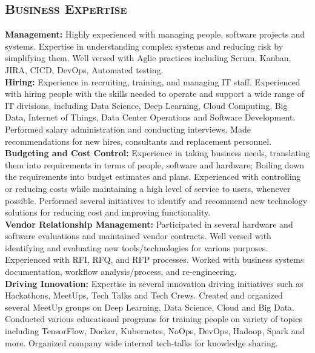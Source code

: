 \begin{resume}
\section{\textsc{Business Expertise}}
{\bf Management:} Highly experienced with managing people, software projects and systems. Expertise in understanding complex systems and reducing risk by simplifying them. Well versed with Aglie practices including Scrum, Kanban, JIRA, CICD, DevOps, Automated testing.\\
{\bf Hiring:} Experience in recruiting, training, and managing IT staff. Experienced with hiring people with the skills needed to operate and support a wide range of IT divisions, including Data Science, Deep Learning, Cloud Computing, Big Data, Internet of Things, Data Center Operations and Software Development. Performed salary administration and conducting interviews. Made recommendations for new hires, consultants and replacement personnel.\\
{\bf Budgeting and Cost Control:} Experience in taking business needs, translating them into requirements in terms of people, software and hardware; Boiling down the requirements into budget estimates and plans. Experienced with controlling or reducing costs while maintaining a high level of service to users, whenever possible. Performed several initiatives to identify and recommend new technology solutions for reducing cost and improving functionality.\\
{\bf Vendor Relationship Management:} Participated in several hardware and software evaluations and maintained vendor contracts. Well versed with identifying and evaluating new tools/technologies for various purposes. Experienced with RFI, RFQ, and RFP processes. Worked with business systems documentation, workflow analysis/process, and re-engineering.\\
{\bf Driving Innovation:} Expertise in several innovation driving initiatives such as Hackathons, MeetUps, Tech Talks and Tech Crews. Created and organized several MeetUp groups on Deep Learning, Data Science, Cloud and Big Data. Conducted various educational programs for training people on variety of topics including TensorFlow, Docker, Kubernetes, NoOps, DevOps, Hadoop, Spark and more. Organized company wide internal tech-talks for knowledge sharing.\\ \\ \\



\end{resume}
